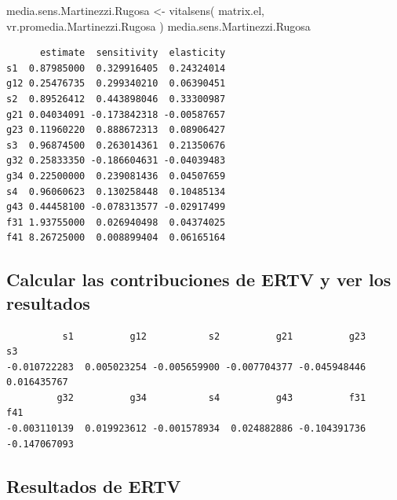 \documentclass[
  12pt,
  letterpaper,
]{book}
\newenvironment{Shaded}{\begin{snugshade}}{\end{snugshade}}
\newcommand{\FunctionTok}[1]{\textcolor[rgb]{0.28,0.35,0.67}{#1}}
\newcommand{\NormalTok}[1]{\textcolor[rgb]{0.00,0.23,0.31}{#1}}
\newcommand{\OtherTok}[1]{\textcolor[rgb]{0.00,0.23,0.31}{#1}}
\newcommand{\SpecialCharTok}[1]{\textcolor[rgb]{0.37,0.37,0.37}{#1}}
\begin{document}
\begin{Shaded}
\begin{Highlighting}[]
\NormalTok{media.sens.Martinezzi.Rugosa }\OtherTok{\textless{}{-}} \FunctionTok{vitalsens}\NormalTok{(}
\NormalTok{  matrix.el,}
\NormalTok{  vr.promedia.Martinezzi.Rugosa}
\NormalTok{)}
\NormalTok{media.sens.Martinezzi.Rugosa}
\end{Highlighting}
\end{Shaded}

\begin{verbatim}
      estimate  sensitivity  elasticity
s1  0.87985000  0.329916405  0.24324014
g12 0.25476735  0.299340210  0.06390451
s2  0.89526412  0.443898046  0.33300987
g21 0.04034091 -0.173842318 -0.00587657
g23 0.11960220  0.888672313  0.08906427
s3  0.96874500  0.263014361  0.21350676
g32 0.25833350 -0.186604631 -0.04039483
g34 0.22500000  0.239081436  0.04507659
s4  0.96060623  0.130258448  0.10485134
g43 0.44458100 -0.078313577 -0.02917499
f31 1.93755000  0.026940498  0.04374025
f41 8.26725000  0.008899404  0.06165164
\end{verbatim}

\subsection{Calcular las contribuciones de ERTV y ver los
resultados}\label{calcular-las-contribuciones-de-ertv-y-ver-los-resultados}

\begin{Shaded}
\end{Shaded}

\begin{verbatim}
          s1          g12           s2          g21          g23           s3 
-0.010722283  0.005023254 -0.005659900 -0.007704377 -0.045948446  0.016435767 
         g32          g34           s4          g43          f31          f41 
-0.003110139  0.019923612 -0.001578934  0.024882886 -0.104391736 -0.147067093 
\end{verbatim}

\subsection{Resultados de ERTV}\label{resultados-de-ertv}
\end{document}
